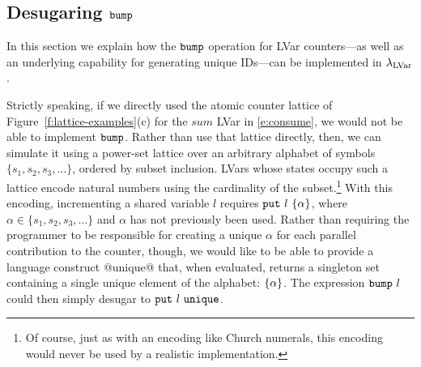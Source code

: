 \subsection{Desugaring $\mbox{\texttt{bump}}$}\label{subsection:bump}

{%
In this section we explain how the $\mbox{\texttt{bump}}$ operation for LVar counters---as well as an underlying
  capability for generating unique IDs---can be implemented in $\lambda_{\textrm{LVar}}$.}

Strictly speaking, if we directly used the atomic counter lattice of Figure~\ref{f:lattice-examples}(c) for the $\mathit{sum}$ LVar in \eqref{e:consume}, we would not
  be able to implement $\mbox{\texttt{bump}}$.
Rather than use that lattice directly, then, we can simulate it 
using a power-set lattice over an arbitrary alphabet of symbols
$\lbrace s_1, s_2, s_3, \ldots\rbrace$, ordered by subset inclusion.
%
LVars whose states occupy such a lattice encode natural numbers using the cardinality
of the subset.\footnote{Of course, just as with an encoding like
  Church numerals, this encoding would never be used by a realistic
  implementation.}  
With this encoding, incrementing a shared variable $l$
requires $\mbox{\texttt{put}}~l~\lbrace \alpha \rbrace$, where 
  $\alpha \in \lbrace s_1, s_2, s_3, \ldots\rbrace$ and 
$\alpha$ has not previously been used.
Rather than requiring the programmer to be responsible for creating a
unique $\alpha$ for each parallel contribution to the counter, though,
we would like to be able to provide a language construct @unique@
that, when evaluated, returns a singleton set containing a single
unique element of the alphabet: $\lbrace \alpha \rbrace$. The expression $\mbox{\texttt{bump}}~l$ could then simply desugar to $\mbox{\texttt{put}}~l~\mbox{\texttt{unique}}$.

